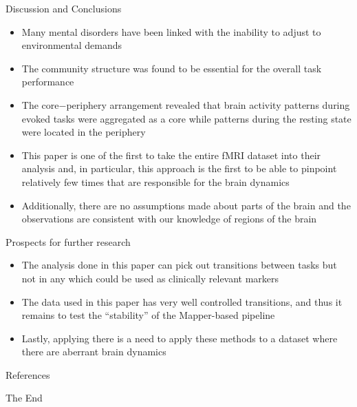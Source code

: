 \documentclass{beamer}
\begin{document}
\begin{frame}{Discussion and Conclusions}
    \begin{itemize}
        \item Many mental disorders have been linked with the inability to adjust to environmental demands
        \item The community structure was found to be essential for the overall task performance
        \item The core$-$periphery arrangement revealed that brain activity patterns during evoked tasks were aggregated as a core while patterns during the resting state were located in the periphery
        \item This paper is one of the first to take the entire fMRI dataset into their analysis and, in particular, this approach is the first to be able to pinpoint relatively few times that are responsible for the brain dynamics
        \item Additionally, there are no assumptions made about parts of the brain and the observations are consistent with our knowledge of regions of the brain
    \end{itemize}
\end{frame}

\begin{frame}{Prospects for further research}
    \begin{itemize}
        \item The analysis done in this paper can pick out transitions between tasks but not in any which could be used as clinically relevant markers
        \item The data used in this paper has very well controlled transitions, and thus it remains to test the ``stability'' of the Mapper-based pipeline
        \item Lastly, applying there is a need to apply these methods to a dataset where there are aberrant brain dynamics 
    \end{itemize}
\end{frame}

\begin{frame}[allowframebreaks]{References}
\printbibliography
\end{frame}


\begin{frame}
\Huge{\centerline{The End}}
\end{frame}

\end{document}

